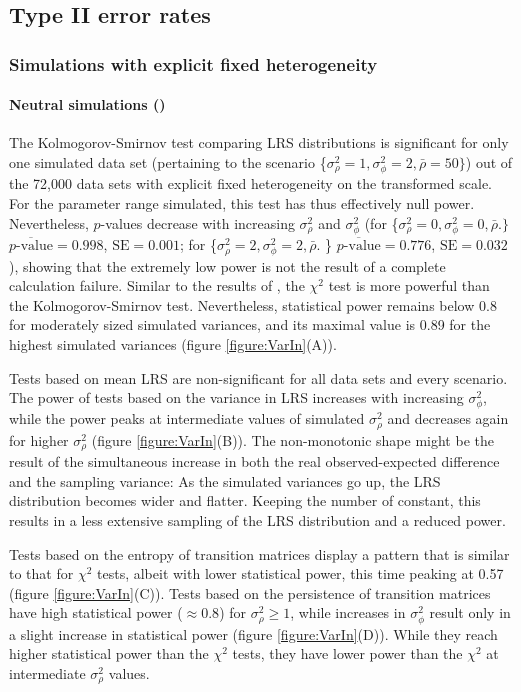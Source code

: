 \subsection{Type II error rates}
\subsubsection{Simulations with explicit fixed heterogeneity}
\paragraph{Neutral simulations (\NSM)}
The Kolmogorov-Smirnov test comparing LRS distributions is significant for only one simulated data set (pertaining to the scenario \{$\sigma_{\rho}^2=1, \sigma_{\phi}^2=2, \bar{\rho}=50\}$) out of the 72,000 data sets with explicit fixed heterogeneity on the transformed scale. For the parameter range simulated, this test has thus effectively null power. Nevertheless, $p$-values decrease with increasing $\sigma_{\rho}^2$ and $\sigma_{\phi}^2$ (for \{$\sigma_{\rho}^2=0, \sigma_{\phi}^2=0, \bar{\rho}.\}$ $\overline{p\textrm{-value}}=0.998$, $\mathrm{SE}=0.001$; for \{$\sigma_{\rho}^2=2, \sigma_{\phi}^2=2, \bar{\rho}. $ \} $\overline{p\textrm{-value}}=0.776$, $\mathrm{SE}=0.032$), showing that the extremely low power is not the result of a complete calculation failure. Similar to the results of \cite{Plard2012}, the $\chi^2$ test is more powerful than the Kolmogorov-Smirnov test. Nevertheless, statistical power remains below 0.8 for moderately sized simulated variances, and its maximal value is 0.89 for the highest simulated variances (figure \ref{figure:VarIn}(A)).

Tests based on mean LRS are non-significant for all data sets and every scenario. The power of tests based on the variance in LRS increases with increasing $\sigma_{\phi}^2$, while the power peaks at intermediate values of simulated $\sigma_{\rho}^2$ and decreases again for higher $\sigma_{\rho}^2$ (figure \ref{figure:VarIn}(B)). The non-monotonic shape might be the result of the simultaneous increase in both the real observed-expected difference and the sampling variance: As the simulated variances go up, the LRS distribution becomes wider and flatter. Keeping the number of \NSM constant, this results in a less extensive sampling of the LRS distribution and a reduced power.

Tests based on the entropy of transition matrices display a pattern that is similar to that for $\chi^2$ tests, albeit with lower statistical power, this time peaking at 0.57 (figure \ref{figure:VarIn}(C)).
Tests based on the persistence of transition matrices have high statistical power ($\approx  0.8$) for $\sigma_{\rho}^2 \geq 1$, while increases in $\sigma_{\phi}^2$ result only in a slight increase in statistical power (figure \ref{figure:VarIn}(D)). While they reach higher statistical power than the $\chi^2$ tests, they have lower power than the $\chi^2$ at intermediate $\sigma_{\rho}^2$ values.


